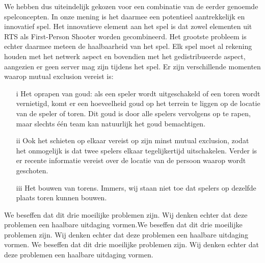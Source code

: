 We hebben dus uiteindelijk gekozen voor een combinatie van de eerder genoemde spelconcepten. In onze mening is het daarmee een potentieel aantrekkelijk en innovatief spel. Het innovatieve element aan het spel is dat zowel elementen uit RTS als First-Person Shooter worden gecombineerd. Het grootste probleem is echter daarmee meteen de haalbaarheid van het spel. Elk spel moet al rekening houden met het netwerk aspect en bovendien met het gedistribueerde aspect, aangezien er geen server mag zijn tijdens het spel. Er zijn verschillende momenten waarop mutual exclusion vereist is:

\begin{enumerate}
\item[i] Het oprapen van goud: als een speler wordt uitgeschakeld of een toren wordt vernietigd, komt er een hoeveelheid goud op het terrein te liggen op de locatie van de speler of toren. Dit goud is door alle spelers vervolgens op te rapen, maar slechts \'e\'en team kan natuurlijk het goud bemachtigen.
\item[ii] Ook het schieten op elkaar vereist op zijn minst mutual exclusion, zodat het onmogelijk is dat twee spelers elkaar tegelijkertijd uitschakelen. Verder is er recente informatie vereist over de locatie van de persoon waarop wordt geschoten.
\item[iii] Het bouwen van torens. Immers, wij staan niet toe dat spelers op dezelfde plaats toren kunnen bouwen.
\end{enumerate}

We beseffen dat dit drie moeilijke problemen zijn. Wij denken echter dat deze problemen een haalbare uitdaging vormen.We beseffen dat dit drie moeilijke problemen zijn. Wij denken echter dat deze problemen een haalbare uitdaging vormen.
We beseffen dat dit drie moeilijke problemen zijn. Wij denken echter dat deze problemen een haalbare uitdaging vormen.
